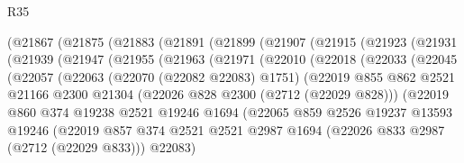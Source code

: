 \begin{lexlean}{R35}
\begin{coremodule}
        (@21867
          (@21875
            (@21883
              (@21891
                (@21899
                  (@21907
                    (@21915
                      (@21923
                        (@21931
                          (@21939
                            (@21947
                              (@21955
                                (@21963
                                  (@21971
                                    (@22010
                                      (@22018
                                        (@22033
                                          (@22045
                                            (@22057
                                              (@22063
                                                (@22070 (@22082 @22083) @1751)
                                                (@22019
                                                  @855
                                                  @862
                                                  @2521
                                                  @21166
                                                  @2300
                                                  @21304
                                                  (@22026 @828 @2300 (@2712 (@22029 @828)))
                                                  (@22019
                                                    @860
                                                    @374
                                                    @19238
                                                    @2521
                                                    @19246
                                                    @1694
                                                    (@22065
                                                      @859
                                                      @2526
                                                      @19237
                                                      @13593
                                                      @19246
                                                      (@22019
                                                        @857
                                                        @374
                                                        @2521
                                                        @2521
                                                        @2987
                                                        @1694
                                                        (@22026 @833 @2987 (@2712 (@22029 @833)))
                                                        @22083)

\end{coremodule}
\end{lexlean}
